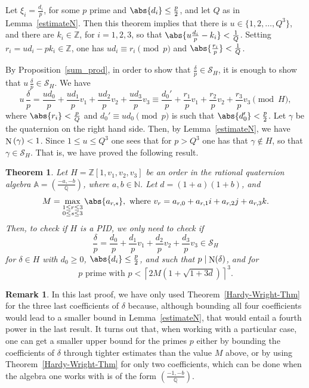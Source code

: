 \documentclass[10pt]{article}
\newtheorem{theorem}{Theorem}
\theoremstyle{definition}
\newtheorem{remark}{Remark}
\newcommand\A{\mathbb{A}}
\newcommand\NN{\mathbb{N}}
\newcommand\QQ{\mathbb{Q}}
\newcommand\ZZ{\mathbb{Z}}
\newcommand\SC{\mathcal{S}}
\newcommand\N{\mathop{\rm N}\nolimits}
\begin{document}
Let $\xi_i = \frac{d_i}{p}$, for some $p$ prime and
$\abs{d_i} \leq \frac{p}{2}$, and let $Q$ as in
Lemma~\ref{estimateN}. Then this theorem implies that there is
$u \in \{ 1,2, \dots, Q^3\}$, and there are $k_i\in\ZZ$, for
$i=1,2,3$, so that $\abs{u \frac{d_i}{p} - k_i} <
\frac{1}{Q}$. Setting $r_i = u d_i - p k_i\in\ZZ$, one has
$u d_i \equiv r_i \pmod{p}$ and $\abs{\frac{r_i}{p}} < \frac{1}{Q}$.

By Proposition~\ref{sum_prod}, in order to show that
$\frac{\delta}{p}\in\SC_H$, it is enough to show that
$u\, \frac{\delta}{p}\in\SC_H$.  We have \small
%
\[ u\, \frac{\delta}{p} = \frac{u d_0}{p} + \frac{u d_1}{p} v_1 +
  \frac{u d_2}{p} v_2 + \frac{u d_3}{p} v_3 \equiv \frac{d_0'}{p} +
  \frac{r_1}{p} v_1 + \frac{r_2}{p} v_2 + \frac{r_3}{p} v_3
  \pmod{H}, \]
%
\normalsize
%
where $\abs{r_i} < \frac{p}{Q}$ and $d_0' \equiv ud_0 \pmod{p}$ is
such that $\abs{d_0'} < \frac{p}{2}$. Let $\gamma$ be the quaternion
on the right hand side. Then, by Lemma~\ref{estimateN}, we have
$\N \left(\gamma \right) < 1 $. Since $1\leq u\leq Q^3$ one sees that
for $p > Q^3$ one has that $\gamma \notin H$, so that
$\gamma\in\SC_H$. That is, we have proved the following result.

\begin{theorem}\label{Reduction_primes}
  Let $H=\ZZ[1,v_1,v_2,v_3]$ be an order in the rational quaternion
  algebra $\A = \left( \frac{-a,-b}{\QQ}\right)$, where $a,b \in
  \NN$. Let $d=(1+a)(1+b)$, and
  \[M= \max_{\substack{1 \leq r \leq 3 \\ 0 \leq s \leq 3}}
    \abs{a_{r,s}}, \text{ where } v_r= a_{r,0} + a_{r,1} i + a_{r,2} j
    + a_{r,3} k.\]
  Then, to check if $H$ is a PID, we only need to check if
  \[\frac{\delta}{p} = \frac{d_0}{p} + \frac{d_1}{p} v_1 +
    \frac{d_2}{p} v_2 + \frac{d_3}{p} v_3 \in \SC_H \] for
  $\delta \in H$ with $d_0\geq 0$, $\abs{d_i} \leq \frac{p}{2}$, and
  such that $ p \mid \N(\delta)$, and for
  \[p \text{ prime} \text{ with } p < \left \lceil 2 M (1+\sqrt{1+3d})
    \right \rceil^3.\]
\end{theorem}

\begin{remark}
  In this last proof, we have only used Theorem~\ref{Hardy-Wright-Thm}
  for the three last coefficients of $\delta$ because, although
  bounding all four coefficients would lead to a smaller bound in
  Lemma~\ref{estimateN}, that would entail a fourth power in the last
  result. It turns out that, when working with a particular case, one
  can get a smaller upper bound for the primes $p$ either by bounding
  the coefficients of $\delta$ through tighter estimates than the
  value $M$ above, or by using Theorem~\ref{Hardy-Wright-Thm} for only
  two coefficients, which can be done when the algebra one works with
  is of the form $\left( \frac{-1,-b}{\QQ} \right)$.
\end{remark}
\end{document}
